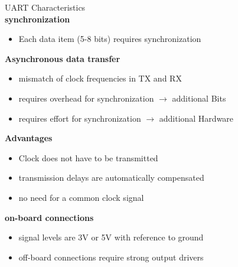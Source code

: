 \begin{concept}{UART Characteristics}
    \vspace{2mm}\\
    \textbf{synchronization}
    \begin{itemize}
        \item Each data item (5-8 bits) requires synchronization
    \end{itemize}
    \vspace{2mm}

    \textbf{Asynchronous data transfer}
    \begin{itemize}
        \item mismatch of clock frequencies in TX and RX
        \item requires overhead for synchronization $\rightarrow$ additional Bits
        \item requires effort for synchronization $\rightarrow$ additional Hardware
    \end{itemize}
    \vspace{2mm}

    \textbf{Advantages}
    \begin{itemize}
        \item Clock does not have to be transmitted
        \item transmission delays are automatically compensated
        \item no need for a common clock signal
    \end{itemize}
    \vspace{2mm}
    
    \textbf{on-board connections}
    \begin{itemize}
        \item signal levels are 3V or 5V with reference to ground
        \item off-board connections require strong output drivers
    \end{itemize}
\end{concept}

